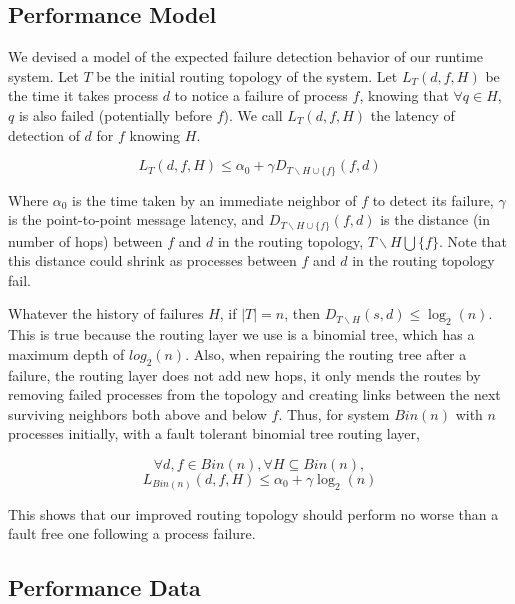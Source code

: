 \subsection{Performance Model} \label{subsect:performance_model}

We devised a model of the expected failure detection behavior of our runtime
system. Let $T$ be the initial routing topology of the system. Let $L_T(d, f,
H)$ be the time it takes process $d$ to notice a failure of process $f$, knowing
that $\forall q\in H$, $q$ is also failed (potentially before $f$). We call
$L_T(d, f, H)$ the latency of detection of $d$ for $f$ knowing $H$.

$$L_T(d, f, H) \leq \alpha_0 + \gamma D_{T \backslash H \cup \{f\}}(f, d)$$

Where $\alpha_0$ is the time taken by an immediate neighbor of $f$ to detect its
failure, $\gamma$ is the point-to-point message latency, and $D_{T \backslash H
\cup \{f\}}(f, d)$ is the distance (in number of hops) between $f$ and $d$ in
the routing topology, $T \backslash H\bigcup \{f\}$. Note that this distance
could shrink as processes between $f$ and $d$ in the routing topology fail.

Whatever the history of failures $H$, if $|T| = n$, then $D_{T \backslash H}(s,
d) \leq \log_2(n)$. This is true because the routing layer we use is a binomial
tree, which has a maximum depth of $log_2(n)$. Also, when repairing the routing
tree after a failure, the routing layer does not add new hops, it only mends the
routes by removing failed processes from the topology and creating links between
the next surviving neighbors both above and below $f$. Thus, for system $Bin(n)$
with $n$ processes initially, with a fault tolerant binomial tree routing layer,

$$\forall d, f\in Bin(n), \forall H \subseteq Bin(n),$$
$$L_{Bin(n)}(d, f, H) \leq \alpha_0 + \gamma \log_2(n)$$

This shows that our improved routing topology should perform no worse than a
fault free one following a process failure.

\subsection{Performance Data} \label{subsect:performance_data}



